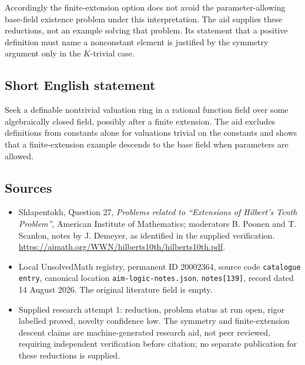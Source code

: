\documentclass[11pt]{article}
\begin{document}
Accordingly the finite-extension option does not avoid the parameter-allowing base-field existence problem under this interpretation. The aid supplies these reductions, not an example solving that problem. Its statement that a positive definition must name a nonconstant element is justified by the symmetry argument only in the $K$-trivial case.
\subsection{Short English statement}
Seek a definable nontrivial valuation ring in a rational function field over some algebraically closed field, possibly after a finite extension. The aid excludes definitions from constants alone for valuations trivial on the constants and shows that a finite-extension example descends to the base field when parameters are allowed.
\subsection{Sources}
\begin{itemize}
\item Shlapentokh, Question 27, \emph{Problems related to ``Extensions of Hilbert's Tenth Problem''}, American Institute of Mathematics; moderators B. Poonen and T. Scanlon, notes by J. Demeyer, as identified in the supplied verification. \url{https://aimath.org/WWN/hilberts10th/hilberts10th.pdf}.
\item Local UnsolvedMath registry, permanent ID 20002364, source code \texttt{catalogue entry}, canonical location \texttt{aim-logic-notes.json}, \texttt{notes[139]}, record dated 14 August 2026. The original literature field is empty.
\item Supplied research attempt 1: reduction, problem status at run open, rigor labelled proved, novelty confidence low. The symmetry and finite-extension descent claims are machine-generated research aid, not peer reviewed, requiring independent verification before citation; no separate publication for these reductions is supplied.
\end{itemize}
\end{document}

